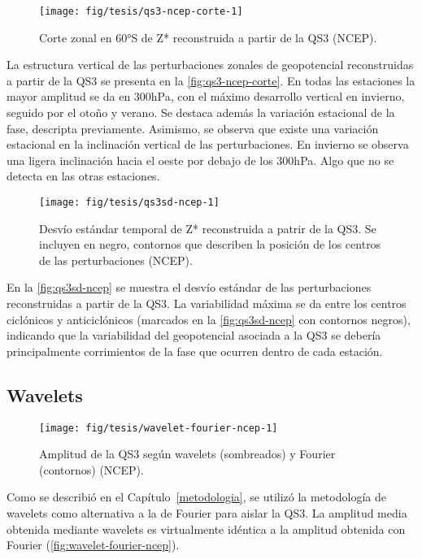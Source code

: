 \documentclass[spanish,a4paper,12p]{book}
\begin{document}
\begin{figure*}
\texttt{[image: fig/tesis/qs3-ncep-corte-1]} \caption{Corte zonal en 60°S de Z* reconstruida a partir de la QS3 (NCEP).}\label{fig:qs3-ncep-corte}
\end{figure*}

La estructura vertical de las perturbaciones zonales de geopotencial
reconstruidas a partir de la QS3 se presenta en la
\autoref{fig:qs3-ncep-corte}. En todas las estaciones la mayor amplitud
se da en 300hPa, con el máximo desarrollo vertical en invierno, seguido
por el otoño y verano. Se destaca además la variación estacional de la
fase, descripta previamente. Asimismo, se observa que existe una
variación estacional en la inclinación vertical de las perturbaciones.
En invierno se observa una ligera inclinación hacia el oeste por debajo
de los 300hPa. Algo que no se detecta en las otras estaciones.

\begin{figure*}
\texttt{[image: fig/tesis/qs3sd-ncep-1]} \caption{Desvío estándar temporal de Z* reconstruida a patrir de la QS3. Se incluyen en negro, contornos que describen la posición de los centros de las perturbaciones (NCEP).}\label{fig:qs3sd-ncep}
\end{figure*}

En la \autoref{fig:qs3sd-ncep} se muestra el desvío estándar de las
perturbaciones reconstruidas a partir de la QS3. La variabilidad máxima
se da entre los centros ciclónicos y anticiclónicos (marcados en la
\autoref{fig:qs3sd-ncep} con contornos negros), indicando que la
variabilidad del geopotencial asociada a la QS3 se debería
principalmente corrimientos de la fase que ocurren dentro de cada
estación.

\subsection{Wavelets}\label{wavelets}

\begin{figure*}
\texttt{[image: fig/tesis/wavelet-fourier-ncep-1]} \caption{Amplitud de la QS3 según wavelets (sombreados) y Fourier (contornos) (NCEP).}\label{fig:wavelet-fourier-ncep}
\end{figure*}

Como se describió en el Capítulo~\ref{metodologia}, se utilizó la
metodología de wavelets como alternativa a la de Fourier para aislar la
QS3. La amplitud media obtenida mediante wavelets es virtualmente
idéntica a la amplitud obtenida con Fourier
(\autoref{fig:wavelet-fourier-ncep}).
\end{document}
